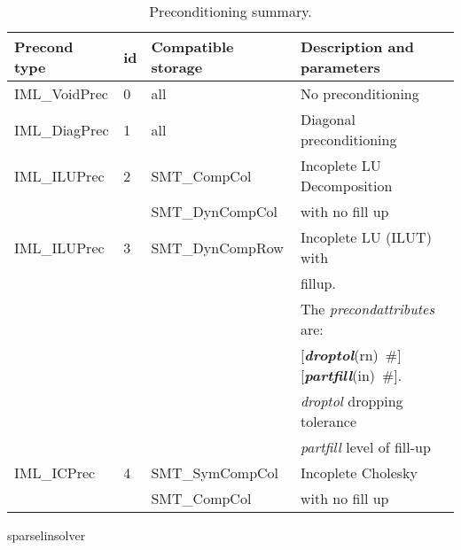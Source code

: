 \documentclass[draft]{article}
\newcommand{\param}[1]{{\em #1}}
\newcommand{\keywordnotype}[1]{\mbox{{\it{\bf{#1}}}}}
\newcommand{\keyword}[2]{\mbox{{\keywordnotype{#1}\tiny (#2)}}}
\newcommand{\field}[2]{\mbox{\keyword{#1}{#2}~\#}}
\newcommand{\optField}[2]{\mbox{[\field{#1}{#2}]}}
\begin{document}
\begin{table}[h]                                                                
\begin{center}                                                                  
\begin{tabular}{|l|l|l|l|}                                                      
\hline                                                                          
Precond type & id & Compatible storage & Description and parameters \\
\hline\hline
IML\_VoidPrec &0& all & No preconditioning\\
\hline
IML\_DiagPrec &1& all & Diagonal preconditioning\\
\hline
IML\_ILUPrec  &2& SMT\_CompCol & Incoplete LU Decomposition\\
              & & SMT\_DynCompCol&with no fill up\\
\hline
IML\_ILUPrec  &3& SMT\_DynCompRow & Incoplete LU (ILUT) with\\
              & &                 &  fillup. \\
              & &                 & The \param{precondattributes} are:\\
              & &                 & \optField{droptol}{rn}
\optField{partfill}{in}.\\
              & &                 & \param{droptol} dropping
tolerance\\
              & &                 & \param{partfill} level of
fill-up\\
\hline
IML\_ICPrec   &4& SMT\_SymCompCol&Incoplete Cholesky\\
              & & SMT\_CompCol   &with no fill up\\
\hline
\end{tabular}                                                                   
\caption{Preconditioning summary.}                
\label{precondtable}                                                         
\end{center}                          sparselinsolver                                          
\end{table}                                                                     
\end{document}
